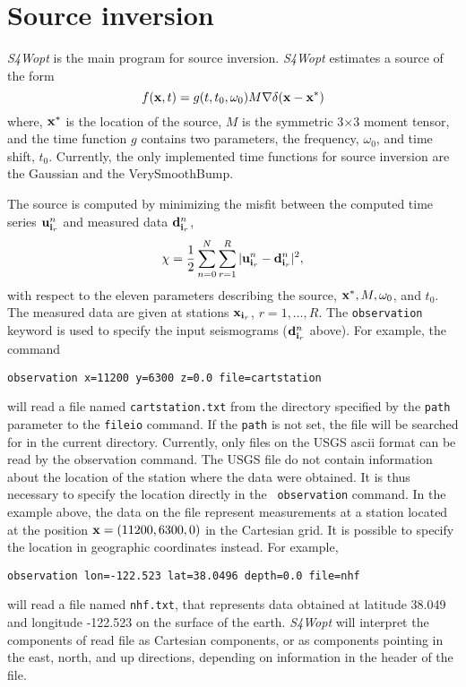 \documentclass[11pt]{report}
\begin{document}
\chapter{Source inversion}
\emph{S4Wopt} is the main program for source inversion. \emph{S4Wopt} estimates a source of the form
$$
 f({\bf x},t) =  g(t,t_0,\omega_0)M\nabla\delta({\bf x}-{\bf x}^*)
$$
where, ${\bf x}^*$ is the location of the source, $M$ is the symmetric 3$\times$3 moment tensor, and the time
function $g$ contains two parameters, the frequency, $\omega_0$, and time shift, $t_0$. Currently, the only
implemented time functions for source inversion are the Gaussian and the VerySmoothBump.
\par
The source is computed by minimizing the misfit between the computed time series ${\bf u}^n_{{\bf i}_r}$ and measured 
data ${\bf d}^n_{{\bf i}_r}$,
$$
 \chi = \frac{1}{2}\sum_{n=0}^N \sum_{r=1}^R |{\bf u}^n_{{\bf i}_r}-{\bf d}^n_{{\bf i}_r}|^2,
$$
with respect to the eleven parameters describing the source, ${\bf x}^*, M, \omega_0$, and $t_0$.
The measured data are given at stations ${\bf x}_{{\bf i}_r}$, $r=1,\ldots,R$.
The {\tt observation} keyword is used to specify the input seismograms (${\bf d}^n_{{\bf i}_r}$ above). 
For example, the command
%
\begin{verbatim}
observation x=11200 y=6300 z=0.0 file=cartstation
\end{verbatim}
%
will read a file named {\tt cartstation.txt} from the directory specified by the {\tt path}
parameter to the {\tt fileio} command. If the {\tt path} is not set, the file will be searched for
in the current directory. Currently, only files on the USGS ascii format can be read by the
observation command. The USGS file do not contain information about the location of the station
where the data were obtained. It is thus necessary to specify the location directly in the {\tt
  observation} command. In the example above, the data on the file represent measurements at a
station located at the position ${\bf x} = (11200,6300,0)$ in the Cartesian grid. It is possible to
specify the location in geographic coordinates instead. For example,
%
\begin{verbatim}
observation lon=-122.523 lat=38.0496 depth=0.0 file=nhf 
\end{verbatim}
%
will read a file named {\tt nhf.txt}, that represents data obtained at latitude 38.049 and longitude
-122.523 on the surface of the earth.  \emph{S4Wopt} will interpret the components of read file as
Cartesian components, or as components pointing in the east, north, and up directions, depending on
information in the header of the file.  
\end{document}
